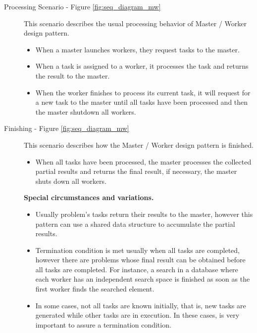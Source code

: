 
\begin{description}
	
	\item[Processing Scenario - Figure \ref{fig:seq_diagram_mw}]
	This scenario describes the usual processing behavior of Master / Worker design pattern. 
	
	\begin{itemize}
		\item  When a master launches workers, they request tasks to the master.
		
		\item  When a task is assigned to a worker, it processes the task and returns the result to the master.
		
		\item  When the worker finishes to process its current task, it will request for a new task to the master until all tasks have been processed and then the master shutdown all workers.
	\end{itemize}
	
	\item[Finishing - Figure \ref{fig:seq_diagram_mw}]
	This scenario describes how the Master / Worker design pattern is finished.
	
	\begin{itemize}
		\item  When all tasks have been processed, the master processes the collected partial results and returns the final result, if necessary, the master shuts down all workers.
	\end{itemize}
	
	\textbf{Special circumstances and variations. }
	
	\begin{itemize}
		\item  Usually problem's tasks return their results to the master, however this pattern can use a shared data structure to accumulate the partial results.
		
		\item  Termination condition is met usually when all tasks are completed, however there are problems whose final result can be obtained before all tasks are completed. For instance, a search in a database where each worker has an independent search space is finished as soon as the first worker finds the searched element.
		
		\item  In some cases, not all tasks are known initially, that is, new tasks are generated while other tasks are in execution. In these cases, is very important to assure a termination condition.
	\end{itemize}
	
\end{description}

